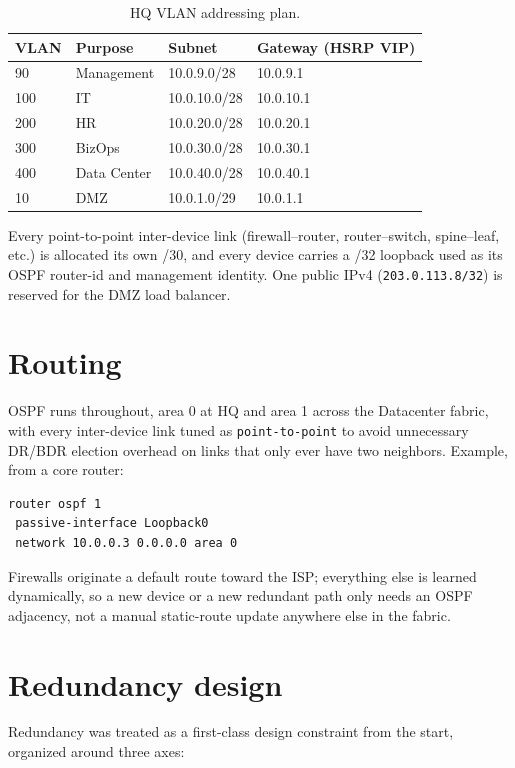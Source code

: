 \documentclass[11pt,a4paper]{report}
\begin{document}
\begin{table}[htbp]
\centering
\begin{tabular}{llll}
\toprule
VLAN & Purpose & Subnet & Gateway (HSRP VIP) \\
\midrule
90  & Management & 10.0.9.0/28  & 10.0.9.1 \\
100 & IT         & 10.0.10.0/28 & 10.0.10.1 \\
200 & HR         & 10.0.20.0/28 & 10.0.20.1 \\
300 & BizOps     & 10.0.30.0/28 & 10.0.30.1 \\
400 & Data Center& 10.0.40.0/28 & 10.0.40.1 \\
10  & DMZ        & 10.0.1.0/29  & 10.0.1.1 \\
\bottomrule
\end{tabular}
\caption{HQ VLAN addressing plan.}
\end{table}

Every point-to-point inter-device link (firewall--router, router--switch,
spine--leaf, etc.) is allocated its own /30, and every device carries a
/32 loopback used as its OSPF router-id and management identity. One public
IPv4 (\texttt{203.0.113.8/32}) is reserved for the DMZ load balancer.

\section{Routing}

OSPF runs throughout, area 0 at HQ and area 1 across the Datacenter fabric,
with every inter-device link tuned as \texttt{point-to-point} to avoid
unnecessary DR/BDR election overhead on links that only ever have two
neighbors. Example, from a core router:

\begin{lstlisting}
router ospf 1
 passive-interface Loopback0
 network 10.0.0.3 0.0.0.0 area 0
\end{lstlisting}

Firewalls originate a default route toward the ISP; everything else is
learned dynamically, so a new device or a new redundant path only needs an
OSPF adjacency, not a manual static-route update anywhere else in the
fabric.

\section{Redundancy design}

Redundancy was treated as a first-class design constraint from the start,
organized around three axes:
\end{document}
